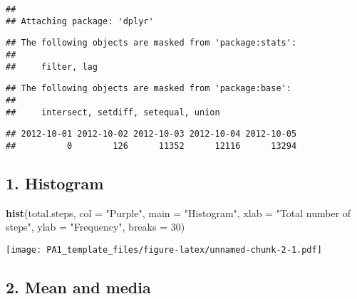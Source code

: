 \documentclass[
]{article}
\newenvironment{Shaded}{\begin{snugshade}}{\end{snugshade}}
\newcommand{\DataTypeTok}[1]{\textcolor[rgb]{0.13,0.29,0.53}{#1}}
\newcommand{\DecValTok}[1]{\textcolor[rgb]{0.00,0.00,0.81}{#1}}
\newcommand{\KeywordTok}[1]{\textcolor[rgb]{0.13,0.29,0.53}{\textbf{#1}}}
\newcommand{\NormalTok}[1]{#1}
\newcommand{\OperatorTok}[1]{\textcolor[rgb]{0.81,0.36,0.00}{\textbf{#1}}}
\newcommand{\OtherTok}[1]{\textcolor[rgb]{0.56,0.35,0.01}{#1}}
\newcommand{\StringTok}[1]{\textcolor[rgb]{0.31,0.60,0.02}{#1}}
\begin{document}
\begin{verbatim}
## 
## Attaching package: 'dplyr'
\end{verbatim}

\begin{verbatim}
## The following objects are masked from 'package:stats':
## 
##     filter, lag
\end{verbatim}

\begin{verbatim}
## The following objects are masked from 'package:base':
## 
##     intersect, setdiff, setequal, union
\end{verbatim}

\begin{Shaded}
\end{Shaded}

\begin{verbatim}
## 2012-10-01 2012-10-02 2012-10-03 2012-10-04 2012-10-05 
##          0        126      11352      12116      13294
\end{verbatim}

\hypertarget{histogram}{%
\subsection{1. Histogram}\label{histogram}}

\begin{Shaded}
\begin{Highlighting}[]
\KeywordTok{hist}\NormalTok{(total.steps,}
     \DataTypeTok{col =} \StringTok{"Purple"}\NormalTok{,}
     \DataTypeTok{main =} \StringTok{"Histogram"}\NormalTok{,}
     \DataTypeTok{xlab =} \StringTok{"Total number of steps"}\NormalTok{,}
     \DataTypeTok{ylab =} \StringTok{"Frequency"}\NormalTok{,}
     \DataTypeTok{breaks =} \DecValTok{30}\NormalTok{)}
\end{Highlighting}
\end{Shaded}

\texttt{[image: PA1\_template\_files/figure-latex/unnamed-chunk-2-1.pdf]}

\hypertarget{mean-and-media}{%
\subsection{2. Mean and media}\label{mean-and-media}}
\end{document}
